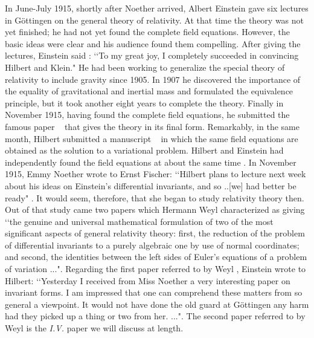 In June-July 1915,
shortly after Noether arrived,  Albert Einstein gave  six 
lectures in G\"{o}ttingen on the general  theory of relativity.   At that time the theory  was
not yet finished; he had not yet found the complete field equations. However,
the basic ideas were clear and his audience found them  compelling.  
After giving the lectures, Einstein said \cite{pais}: \lq\lq To my great joy, I completely 
succeeded in convincing Hilbert and Klein." He had been working to generalize
the special theory of relativity to include gravity since 1905. In 1907 he
discovered the importance  of the equality of gravitational and inertial mass
and formulated the equivalence principle, but it took another eight years  to
complete the theory.  Finally in November 1915, having found the complete field
equations, he submitted   the famous paper \cite{einstein} ~ that gives the theory
in its final form. Remarkably, in the same month,  Hilbert
submitted a manuscript \cite{hilbert} ~ in which the same field  equations are
obtained as the solution to a variational problem. Hilbert and
Einstein  had independently found the field equations at about the same
time \cite{pais}.  
In  November 1915, Emmy Noether  wrote to Ernst Fischer:
\lq\lq Hilbert plans to lecture next week about his ideas on Einstein's
differential invariants, and so ..[we] had better be ready" \cite{Dick}.  It would
seem, therefore, that she 
 began to study relativity theory then.  Out of that
study came two papers which Hermann Weyl characterized as giving \lq\lq the
genuine and universal mathematical formulation of two of  the most significant
aspects of general relativity theory: first, the reduction of the problem of
differential invariants to a purely algebraic one by use of normal coordinates;
and second, the identities between the left sides of Euler's equations of a
problem of variation ..."\cite{weyl}.  Regarding the first paper 
referred to by Weyl 
\cite{paper1}, Einstein wrote to Hilbert: \lq\lq Yesterday I  received from Miss
Noether a very interesting paper on invariant forms. I am impressed that one
can comprehend these matters from so general a viewpoint. It would not have
done the old guard at G\"{o}ttingen any harm had they picked up a thing or two
from her. ..."\cite{kimb}. The second paper referred to by Weyl
  is the {\it{I.V.}} paper we will discuss at length.

